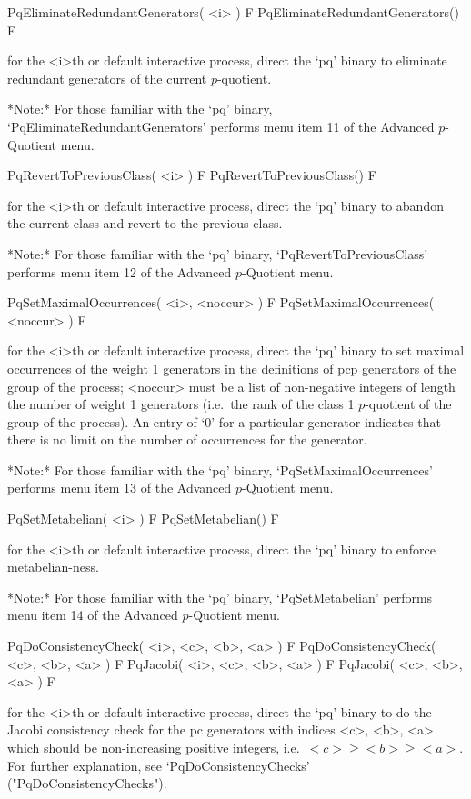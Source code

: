 \>PqEliminateRedundantGenerators( <i> ) F
\>PqEliminateRedundantGenerators() F

for the <i>th or default interactive {\ANUPQ} process, direct  the  `pq'
binary to eliminate redundant generators of the current $p$-quotient.

*Note:* 
For those familiar with the `pq' binary, `PqEliminateRedundantGenerators'
performs menu item 11 of the Advanced $p$-Quotient menu.

\>PqRevertToPreviousClass( <i> ) F
\>PqRevertToPreviousClass() F

for the <i>th or default interactive {\ANUPQ} process, direct  the  `pq'
binary to abandon the current class and revert to the previous class.

*Note:*
For  those  familiar  with  the  `pq'  binary,  `PqRevertToPreviousClass'
performs menu item 12 of the Advanced $p$-Quotient menu.

\>PqSetMaximalOccurrences( <i>, <noccur> ) F
\>PqSetMaximalOccurrences( <noccur> ) F

for the <i>th or default interactive {\ANUPQ} process, direct  the  `pq'
binary to set maximal occurrences of  the  weight  1  generators  in  the
definitions of pcp generators of the group of the process; <noccur>  must
be a list of non-negative integers of  length  the  number  of  weight  1
generators (i.e.~the rank of the class 1 $p$-quotient of the group of the
process). An entry of `0' for a particular generator indicates that there
is no limit on the number of occurrences for the generator.

*Note:*
For  those  familiar  with  the  `pq'  binary,  `PqSetMaximalOccurrences'
performs menu item 13 of the Advanced $p$-Quotient menu.

\>PqSetMetabelian( <i> ) F
\>PqSetMetabelian() F

for the <i>th or default interactive {\ANUPQ} process,  direct  the  `pq'
binary to enforce metabelian-ness.

*Note:* 
For those familiar  with  the  `pq'  binary,  `PqSetMetabelian'  performs
menu item 14 of the Advanced $p$-Quotient menu.

\>PqDoConsistencyCheck( <i>, <c>, <b>, <a> ) F
\>PqDoConsistencyCheck( <c>, <b>, <a> ) F
\>PqJacobi( <i>, <c>, <b>, <a> ) F
\>PqJacobi( <c>, <b>, <a> ) F

for the <i>th or default interactive {\ANUPQ} process,  direct  the  `pq'
binary to do the Jacobi consistency check  for  the  pc  generators  with
indices <c>, <b>, <a> which should be non-increasing  positive  integers,
i.e.~$<c>   \ge   <b>   \ge   <a>$.   For   further   explanation,    see
`PqDoConsistencyChecks' ("PqDoConsistencyChecks").


